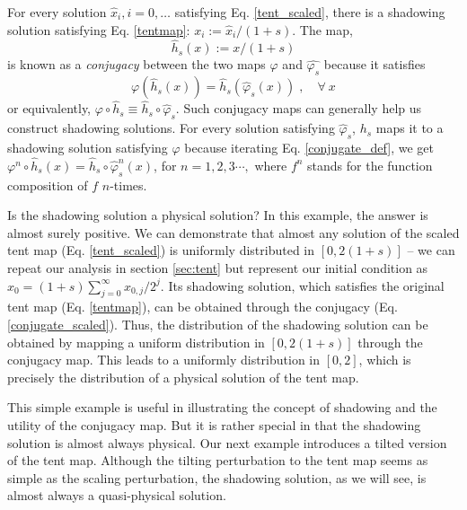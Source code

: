 \documentclass[preprint,12pt]{elsarticle}
\begin{document}
For every solution $\hat{x}_i,i=0,\ldots$ satisfying Eq. \ref{tent_scaled}, there is a shadowing solution satisfying Eq. \ref{tentmap}: $x_i:= \hat{x}_i/(1+s)$.  The map,
\begin{equation} \label{conjugate_scaled}
    \hat{h}_s(x):=x/(1+s)
\end{equation}
is known as a \emph{conjugacy} between the two maps $\varphi$ and $\hat{\varphi_s}$ 
because it satisfies
\begin{equation} \label{conjugate_def}
    \varphi(\hat{h}_s(x)) = \hat{h}_s(\hat\varphi_s(x))\;,\quad \forall\: x
\end{equation}
or equivalently, $\varphi\circ \hat{h}_s \equiv \hat{h}_s\circ\hat\varphi_s$.
Such conjugacy maps can generally help us construct shadowing solutions.
For every solution satisfying
$\hat{\varphi}_s$, $h_s$ maps it to a shadowing solution satisfying $\varphi$ because iterating Eq. \ref{conjugate_def}, we get $\varphi^n \circ \hat{h}_s (x) = \hat{h}_s \circ \hat{\varphi}_s^n(x)$, for $n = 1,2,3\cdots, $ where $f^n$ stands for the function composition of $f$ $n$-times.

Is the shadowing solution a physical solution?  In this example,
the answer is almost surely positive.  We can demonstrate that
almost any solution of the scaled tent map (Eq. \ref{tent_scaled}) is uniformly
distributed in $[0, 2(1+s)]$ -- we can repeat our analysis
in section \ref{sec:tent} but represent our initial condition as
$x_0= (1+s) \sum_{j=0}^\infty x_{0,j} / 2^j$.  Its shadowing solution,
which satisfies the original tent map (Eq. \ref{tentmap}), can be obtained through the
conjugacy (Eq. \ref{conjugate_scaled}).  Thus, the distribution
of the shadowing solution can be obtained by mapping a uniform
distribution in $[0,2(1+s)]$ through the conjugacy map.
This leads to a uniformly distribution in $[0,2]$, which is
precisely the distribution of a physical solution of the tent map.

This simple example is useful in illustrating the concept of shadowing
and the utility of the conjugacy map.  But it is rather special
in that the shadowing solution is almost always physical.  Our next
example introduces a tilted version of the tent map.  Although
the tilting perturbation to the tent map seems as simple as the
scaling perturbation, the shadowing solution, as we will see,
is almost always a quasi-physical solution.
\end{document}

